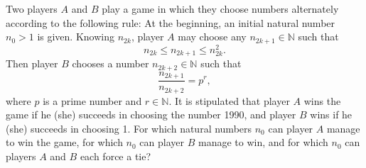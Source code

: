 Two players $A$ and $B$ play a game in which they choose numbers alternately according to the following rule: At the beginning, an initial natural number $n_0 > 1$ is given. Knowing $n_{2k}$, player $A$ may choose any $n_{2k+1} \in \mathbb{N}$ such that
\[ n_{2k} \leq n_{2k+1} \leq n_{2k}^2. \]
Then player $B$ chooses a number $n_{2k+2} \in \mathbb{N}$ such that
\[ \frac{n_{2k+1}}{n_{2k+2}} = p^r, \]
where $p$ is a prime number and $r \in \mathbb{N}$. It is stipulated that player $A$ wins the game if he (she) succeeds in choosing the number 1990, and player $B$ wins if he (she) succeeds in choosing 1. For which natural numbers $n_0$ can player $A$ manage to win the game, for which $n_0$ can player $B$ manage to win, and for which $n_0$ can players $A$ and $B$ each force a tie?
